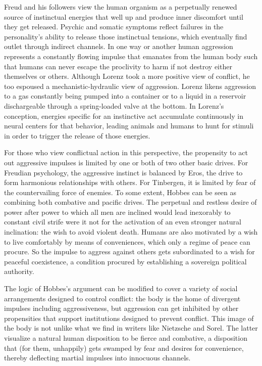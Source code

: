 Freud and his followers view the human organism as a perpetually renewed source of instinctual energies that well up and produce inner discomfort until they get released. Psychic and somatic symptoms reflect failures in the personality's ability to release those instinctual tensions, which eventually find outlet through indirect channels. In one way or another human aggression represents a constantly flowing impulse that emanates from the human body such that humans can never escape the proclivity to harm if not destroy either themselves or others. Although Lorenz took a more positive view of conflict, he too espoused a mechanistic-hydraulic view of aggression. Lorenz likens aggression to a gas constantly being pumped into a container or to a liquid in a reservoir dischargeable through a spring-loaded valve at the bottom. In Lorenz's conception, energies specific for an instinctive act accumulate continuously in neural centers for that behavior, leading animals and humans to hunt for stimuli in order to trigger the release of those energies.

For those who view conflictual action in this perspective, the propensity to act out aggressive impulses is limited by one or both of two other basic drives. For Freudian psychology, the aggressive instinct is balanced by Eros, the drive to form harmonious relationships with others. For Tinbergen, it is limited by fear of the countervailing force of enemies. To some extent, Hobbes can be seen as combining both combative and pacific drives. The perpetual and restless desire of power after power to which all men are inclined would lead inexorably to constant civil strife were it not for the activation of an even stronger natural inclination: the wish to avoid violent death. Humans are also motivated by a wish to live comfortably by means of conveniences, which only a regime of peace can procure. So the impulse to aggress against others gets subordinated to a wish for peaceful coexistence, a condition procured by establishing a sovereign political authority.

The logic of Hobbes's argument can be modified to cover a variety of social arrangements designed to control conflict: the body is the home of divergent impulses including aggressiveness, but aggression can get inhibited by other propensities that support institutions designed to prevent conflict. This image of the body is not unlike what we find in writers like Nietzsche and Sorel. The latter visualize a natural human disposition to be fierce and combative, a disposition that (for them, unhappily) gets swamped by fear and desires for convenience, thereby deflecting martial impulses into innocuous channels.

